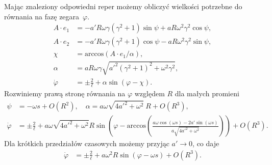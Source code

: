 Mając znaleziony odpowiedni reper możemy obliczyć wielkości
potrzebne do równania na fazę zegara~$\varphi$.
\begin{align*}\nonumber
A\cdot e_1 &= -a'R\omega \gamma \left( \gamma^2+1 \right)\sin\psi
 + a R \omega^2\gamma^2\cos\psi ,       \\
A\cdot e_2 &= -a'R\omega \gamma \left( \gamma^2+1 \right)\cos\psi
 - a R \omega^2 \gamma^2 \sin \psi  ,     \nonumber  \\
\chi & = \text{arccos} \left( A\cdot e_1 / \alpha \right) ,
\\
\alpha & = 
a R \omega \gamma \sqrt{a'^2 \left(\gamma ^2+1\right)^2
 +   \omega^2\gamma^2} ,
\\
\dot{\varphi} &= \pm \frac{2}{\ell} + \alpha \sin (\varphi - \chi) .
\end{align*}
Rozwiniemy prawą stronę równania na $\varphi$ względem $R$ dla małych promieni 
\begin{align*}
\psi &= - \omega s + O(R^2), \quad 
\alpha = a \omega  \sqrt{4 a'^2+\omega ^2} \ R +
 O(R^3), \\
\dot{\varphi} &= \pm \frac{2}{\ell} + 
a \omega  \sqrt{4 a'^2+\omega ^2} R 
\sin \left( \varphi - \text{arccos} \left( 
\frac{a \omega \cos (\omega s) 
- 2 a' \sin (\omega s)}{a\sqrt{4a'^2 + \omega^2}} 
\right) \right) + O(R^3).
\end{align*}
Dla krótkich przedziałów czasowych możemy przyjąc $a' \to 0$, co daje
\begin{align*}
\dot{\varphi} &= \pm \frac{2}{\ell} + 
a \omega ^2 R 
\sin \left( \varphi - \omega s \right) + O(R^3).
\end{align*}



